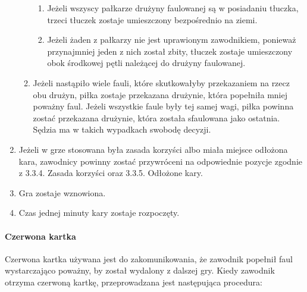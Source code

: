 \documentclass[12pt]{article}
\begin{document}
\begin{enumerate}
\begin{enumerate}
    \begin{enumerate}
    \item
            Jeżeli wszyscy pałkarze drużyny faulowanej są w posiadaniu
      tłuczka, trzeci tłuczek zostaje umieszczony bezpośrednio na ziemi.
          \item
            Jeżeli żaden z pałkarzy nie jest uprawionym zawodnikiem, ponieważ
      przynajmniej jeden z nich został zbity, tłuczek zostaje
      umieszczony obok środkowej pętli należącej do drużyny faulowanej.
          \end{enumerate}
  \item
        Jeżeli nastąpiło wiele fauli, które skutkowałyby przekazaniem na
    rzecz obu drużyn, piłka zostaje przekazana drużynie, która popełniła
    mniej poważny faul. Jeżeli wszystkie faule były tej samej wagi,
    piłka powinna zostać przekazana drużynie, która została sfaulowana
    jako ostatnia. Sędzia ma w takich wypadkach swobodę decyzji.
      \end{enumerate}
\item
    Jeżeli w grze stosowana była zasada korzyści albo miała miejsce
  odłożona kara, zawodnicy powinny zostać przywróceni na odpowiednie
  pozycje zgodnie z 3.3.4. Zasada korzyści oraz 3.3.5. Odłożone kary.
  \item
    Gra zostaje wznowiona.
  \item
    Czas jednej minuty kary zostaje rozpoczęty.
  \end{enumerate}

\paragraph{Czerwona kartka}
Czerwona kartka używana jest do
zakomunikowania, że zawodnik popełnił faul wystarczająco poważny, by
został wydalony z dalszej gry. Kiedy zawodnik otrzyma czerwoną kartkę,
przeprowadzana jest następująca procedura:
\end{document}
